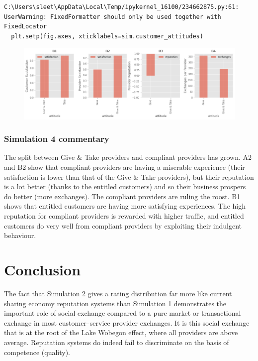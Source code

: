 \documentclass[
  letterpaper,
  DIV=11,
  numbers=noendperiod]{scrartcl}
\begin{document}
\begin{verbatim}
C:\Users\sleet\AppData\Local\Temp/ipykernel_16100/234662875.py:61: UserWarning: FixedFormatter should only be used together with FixedLocator
  plt.setp(fig.axes, xticklabels=sim.customer_attitudes)
\end{verbatim}

\begin{figure}[H]

{\centering \includegraphics{provider-reputation_files/figure-pdf/cell-14-output-3.png}

}

\end{figure}

\hypertarget{simulation-4-commentary}{%
\subsubsection{Simulation 4 commentary}\label{simulation-4-commentary}}

The split between Give \& Take providers and compliant providers has
grown. A2 and B2 show that compliant providers are having a miserable
experience (their satisfaction is lower than that of the Give \& Take
providers), but their reputation is a lot better (thanks to the entitled
customers) and so their business prospers do better (more exchanges).
The compliant providers are ruling the roost. B1 shows that entitled
customers are having more satisfying experiences. The high reputation
for compliant providers is rewarded with higher traffic, and entitled
customers do very well from compliant providers by exploiting their
indulgent behaviour.

\hypertarget{conclusion}{%
\section{Conclusion}\label{conclusion}}

The fact that Simulation 2 gives a rating distribution far more like
current sharing economy reputation systems than Simulation 1
demonstrates the important role of social exchange compared to a pure
market or transactional exchange in most customer--service provider
exchanges. It is this social exchange that is at the root of the Lake
Wobegon effect, where all providers are above average. Reputation
systems do indeed fail to discriminate on the basis of competence
(quality).
\end{document}
